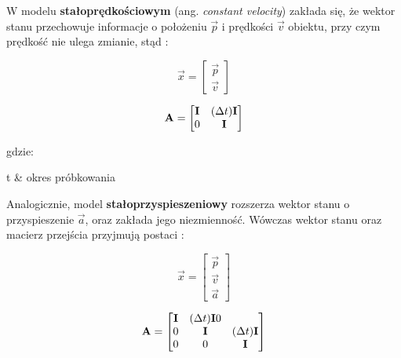 W modelu \textbf{stałoprędkościowym} (ang. \textit{constant velocity}) zakłada się, że wektor stanu przechowuje informacje o położeniu $\vec{p}$ i prędkości $\vec{v}$ obiektu, przy czym prędkość nie ulega zmianie, stąd \cite{Forsyth2012}:

\begin{equation}
\label{equ:Filtr_Kalmana_model_stalopredkosciowy_wektor_stanu}
	\vec{x} = \begin{bmatrix}
		\vec{p} \\
		\vec{v}
	\end{bmatrix}
\end{equation}

\begin{equation}
\label{equ:Filtr_Kalmana_model_stalopredkosciowy_macierz_przejscia}
	\mathbf{A} = \begin{bmatrix}
		\mathbf{I} & (\Delta t) \mathbf{I} \\
		0 & \mathbf{I}
	\end{bmatrix}
\end{equation}

\noindent
gdzie:

\begin{conditions}
	\Delta t & okres próbkowania \\
\end{conditions}

Analogicznie, model \textbf{stałoprzyspieszeniowy} rozszerza wektor stanu o przyspieszenie $\vec{a}$, oraz zakłada jego niezmienność. Wówczas wektor stanu oraz macierz przejścia przyjmują postaci \cite{Forsyth2012}:

\begin{equation}
\label{equ:Filtr_Kalmana_model_staloprzyspieszeniowy_wektor_stanu}
	\vec{x} = \begin{bmatrix}
		\vec{p} \\
		\vec{v} \\
		\vec{a} 
	\end{bmatrix}
\end{equation}

\begin{equation}
\label{equ:Filtr_Kalmana_model_staloprzyspieszeniowy_macierz_przejscia}
	\mathbf{A} = \begin{bmatrix}
		\mathbf{I} & (\Delta t) \mathbf{I} 0 \\
		0 & \mathbf{I} & (\Delta t) \mathbf{I} \\
		0 & 0 & \mathbf{I}
	\end{bmatrix}
\end{equation}

